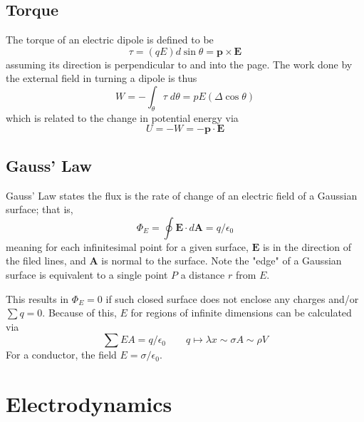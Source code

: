 \documentclass[oneside,11pt]{book}
\renewcommand{\b}{\mathbf}
\begin{document}
\section{Torque}
The torque of an electric dipole is defined to be
\begin{equation}
    \tau = (qE)d \sin \theta = \b p \times \b E
\end{equation}
assuming its direction is perpendicular to and into the page. The work done by the external field in turning a dipole is thus
\begin{equation}
    W = - \int_\theta \tau \; d \theta = pE(\Delta \cos \theta)
\end{equation}
which is related to the change in potential energy via
\begin{equation}
    U = - W = - \b p \cdot \b E
\end{equation}

\section{Gauss' Law}
Gauss' Law states the flux is the rate of change of an electric field of a Gaussian surface; that is,
\begin{equation}
    \Phi_E = \oint \b E \cdot d \b A = q / \epsilon_0
\end{equation}
meaning for each infinitesimal point for a given surface, $\b E$ is in the direction of the filed lines, and $\b A$ is normal to the surface. Note the "edge" of a Gaussian surface is equivalent to a single point $P$ a distance $r$ from $E$.

\bigskip
This results in $\Phi_E = 0$ if such closed surface does not enclose any charges and/or $\sum q = 0$. Because of this, $E$ for regions of infinite dimensions can be calculated via \begin{equation}
    \sum EA = q / \epsilon_0 \qquad q \mapsto \lambda x \sim \sigma A \sim \rho V
\end{equation}
For a conductor, the field $E = \sigma / \epsilon_0$.

\chapter{Electrodynamics}
\end{document}
